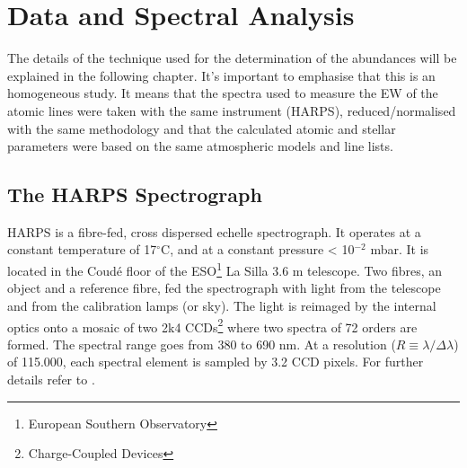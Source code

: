 \documentclass[dvips,12pt,a4paper]{report}
\begin{document}
{%

\chapter {Data and Spectral Analysis}
\label{chap_3}
The details of the technique used for the determination of the abundances will be explained in the following chapter.  It's important to emphasise that this is an homogeneous study. It means that the spectra used to measure the EW of the atomic lines were taken with the same instrument (HARPS), reduced/normalised with the same methodology and that the calculated atomic and stellar parameters were based on the same atmospheric models and line lists.

\section {The HARPS Spectrograph}


HARPS is a fibre-fed, cross dispersed echelle spectrograph. It operates at a constant temperature of 17$^\circ$C, and at a constant pressure < 10$^{-2}$ mbar. It is located in the Coud\'{e} floor of the ESO\footnote{European Southern Observatory} La Silla 3.6 m telescope. Two fibres, an object and a reference fibre, fed the spectrograph with light from the telescope and from the calibration lamps (or sky). The light is reimaged by the internal optics onto a mosaic of two 2k4 CCDs\footnote{Charge-Coupled Devices} where two spectra of 72 orders are formed. The spectral range goes from 380 to 690 nm. At a resolution ($R\equiv\lambda/\Delta\lambda$) of 115.000, each spectral element is sampled by 3.2 CCD pixels. For further details refer to \citet{Mayor-2003b}.


}
\end{document}
